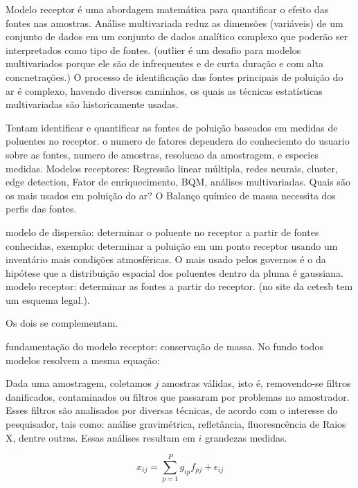 
Modelo receptor é uma abordagem matemática para quantificar o efeito das fontes nas amostras. 
Análise multivariada reduz as dimensões (variáveis) de um conjunto de dados em um conjunto de dados analítico complexo que poderão ser interpretados como tipo de fontes. \citep{Rizzo2007}
(outlier é um desafio para modelos multivariados porque ele são de infrequentes e de curta duração e com alta concnetrações.)
O processo de identificação das fontes principais de poluição do ar é complexo, havendo diversos caminhos, os quais as técnicas estatísticas multivariadas são historicamente usadas.

Tentam identificar e quantificar as fontes de poluição baseados em medidas de poluentes no receptor. 
 o numero de fatores dependera do conheciemto do usuario sobre as fontes, numero de amostras, resolucao da amostragem, e especies medidas.
Modelos receptores: Regressão linear múltipla, redes neurais, cluster, edge detection, Fator de enriquecimento, BQM, análises multivariadas. Quais são os mais usados em poluição do ar?
O Balanço químico de massa necessita dos perfis das fontes.

modelo de dispersão: determinar o poluente no receptor a partir de fontes conhecidas, exemplo: determinar a poluição em um ponto receptor usando um inventário mais condições atmosféricas. O mais usado pelos governos é o da hipótese que a distribuição espacial dos poluentes dentro da pluma é gaussiana.  
modelo receptor: determinar as fontes a partir do receptor. (no site da cetesb tem um esquema legal.).

Os dois se complementam.

fundamentação do modelo receptor: conservação de massa. No fundo todos modelos resolvem a mesma equação: 

Dada uma amostragem, coletamos $j$ amostras válidas, isto é, removendo-se filtros danificados, contaminados ou filtros que passaram por problemas no amostrador. Esses filtros são analisados por diversas técnicas, de acordo com o interesse do pesquisador, tais como: análise gravimétrica, refletância, fluoresncência de Raios X, dentre outras. Essas análises resultam em $i$ grandezas medidas.

\begin{equation}
  x_{ij} = \sum_{p=1}^{P} g_{ip}f_{pj} + \epsilon_{ij}
\end{equation} 

